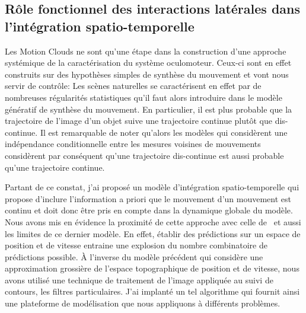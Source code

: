 \documentclass[11pt,french,a4paper,oneside]{article}%
\begin{document}
\subsection{Rôle fonctionnel des interactions latérales dans l'intégration spatio-temporelle~\citep{Perrinet12pred,Khoei13jpp,KhoeiMassonPerrinet17}%
}%
\label{sec:prediction}%
Les Motion Clouds ne sont qu'une étape dans la construction d'une approche systémique de la caractérisation du système oculomoteur. Ceux-ci sont en effet construits sur des hypothèses simples de synthèse du mouvement et vont nous servir de contrôle: Les scènes naturelles se caractérisent en effet par de nombreuses régularités statistiques qu'il faut alors introduire dans le modèle génératif de synthèse du mouvement. En particulier, il est plus probable que la trajectoire de l'image d'un objet suive une trajectoire continue plutôt que dis-continue. Il est remarquable de noter qu'alors les modèles qui considèrent une indépendance conditionnelle entre les mesures voisines de mouvements considèrent par conséquent qu'une trajectoire dis-continue est aussi probable qu'une trajectoire continue. 

Partant de ce constat, j'ai proposé un modèle d'intégration spatio-temporelle qui propose d'inclure l'information a priori que le mouvement d'un mouvement est continu et doit donc être pris en compte dans la dynamique globale du modèle. Nous avons mis en évidence la proximité de cette approche avec celle de~\citet{Burgi00} et aussi les limites de ce dernier modèle. En effet, établir des prédictions sur un espace de position et de vitesse entraine une explosion du nombre combinatoire de prédictions possible. À l'inverse du modèle précédent qui considère une approximation grossière de l'espace topographique de position et de vitesse, nous avons utilisé une technique de traitement de l'image appliquée au suivi de contours, les filtres particulaires. J'ai implanté un tel algorithme qui fournit ainsi une plateforme de modélisation que nous appliquons à différents problèmes. 
\end{document}
